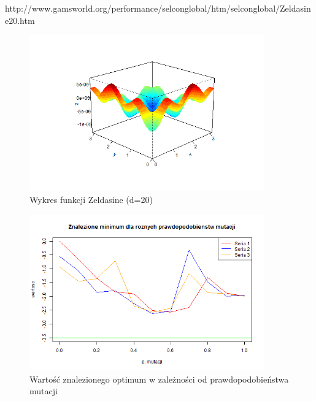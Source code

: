\documentclass[11pt, a4paper]{article}
\begin{document}
http://www.gamsworld.org/performance/selconglobal/htm/selconglobal/Zeldasine20.htm

\begin{figure}[H]
	\begin{center}
		\includegraphics[width=0.9\textwidth]{./assets/Zeldasine201.png} %
		\caption{Wykres funkcji Zeldasine (d=20)}
		\label{fig:zeldasine1}
	\end{center}
\end{figure}

\begin{figure}[H]
	\begin{center}
		\includegraphics[width=0.9\textwidth]{./assets/Zeldasine202.png} %
		\caption{Wartość znalezionego optimum w zależności od prawdopodobieństwa mutacji}
		\label{fig:zeldasine2}
	\end{center}
\end{figure}
\end{document}
